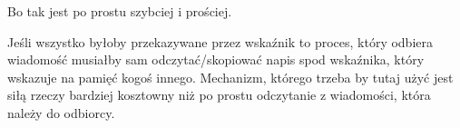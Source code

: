 Bo tak jest po prostu szybciej i prościej.

Jeśli wszystko byłoby przekazywane przez wskaźnik to proces, który odbiera wiadomość musiałby sam odczytać/skopiować napis spod wskaźnika, który wskazuje na pamięć kogoś innego.  
Mechanizm, którego trzeba by tutaj użyć jest siłą rzeczy bardziej kosztowny niż po prostu odczytanie z wiadomości, która należy do odbiorcy.